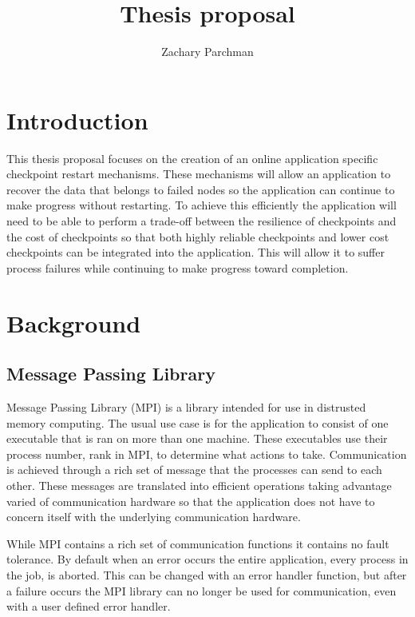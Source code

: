 \documentclass{article}
\title{Thesis proposal}
\author{Zachary Parchman}
\date{}
\begin{document}
\maketitle

\thispagestyle{empty}

\section{Introduction}
This thesis proposal focuses on the creation of an online application
specific checkpoint restart mechanisms. 
These mechanisms will allow an application to recover the data that belongs to 
failed nodes so the application can continue to make progress without 
restarting. 
To achieve this efficiently the application will need to be able to
perform a trade-off between the resilience of checkpoints and the cost of
checkpoints so that both highly 
reliable checkpoints and lower cost checkpoints can be integrated into the
application. This will allow it to suffer process failures while continuing
to make
progress toward completion.

\section{Background}
\subsection{Message Passing Library}
Message Passing Library (MPI) is a library intended for use in distrusted
memory computing. The usual use case is for the application to
consist of one executable that is ran on more than one machine. These
executables use their process number, rank in MPI, to determine what actions
to take. Communication is achieved through a rich set of message that the
processes can send to each other. These messages are translated into
efficient operations taking advantage varied of communication hardware so
that the application does not have to concern itself with the underlying
communication hardware. 

While MPI contains a rich set of communication functions it contains no
fault tolerance. By default when an error occurs the entire application,
every process in the job, is aborted. This can be changed with an error
handler function, but after a failure occurs the MPI library can no longer
be used for communication, even with a user defined error handler.
\end{document}
